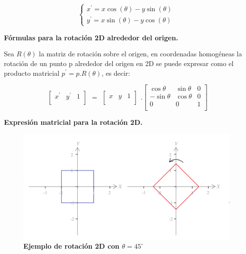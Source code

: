 \begin{equation}
\begin{cases}
{x}^{\prime} = x \cos(\theta) - y \sin(\theta) \\ 
{y}^{\prime} = x \sin(\theta) - y \cos(\theta)
\end{cases}
\end{equation}

\begin{center}
\textbf{\footnotesize{Fórmulas para la rotación 2D alrededor del origen.}}
\end{center}

Sea $R(\theta)$ la matriz de rotación sobre el origen, en coordenadas homogéneas la
rotación de un punto p alrededor del origen en 2D se puede expresar como el producto matricial $p^{\prime} = p.R(\theta)$, es decir:

\begin{equation}
\begin{array}{rccl}
\left[
\begin{array}{rccl}
{x}^{\prime} & {y}^{\prime} & 1\\
\end{array}
\right]
\end{array}
=
\begin{array}{rccl}
\left[
\begin{array}{rccl}
x & y &  1\\
\end{array}
\right]
\end{array} 
.
\left[
\begin{array}{rccl}
\cos\theta & \sin\theta & 0\\
-\sin\theta & \cos\theta & 0\\
0 & 0 & 1\\
\end{array}
\right]
\end{equation}

\begin{center}
\textbf{\footnotesize{Expresión matricial para la rotación 2D.}}
\end{center}


\begin{figure}[h]
\includegraphics[width=12cm]{Img/GEO/geo-rot2d45.jpg}
\centering
    \caption{\footnotesize{\textbf{Ejemplo de rotación 2D con $\theta = 45^{\circ}$}}}
\end{figure}


